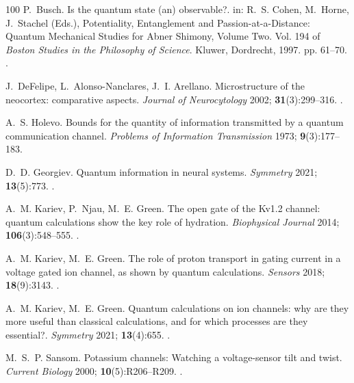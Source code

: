 \documentclass{ws-ijmpb}
\begin{document}
\begin{thebibliography}{100}
P.~Busch. Is the quantum state (an) observable?. in: R.~S. Cohen, M.~Horne,
  J.~Stachel (Eds.), Potentiality, Entanglement and Passion-at-a-Distance:
  Quantum Mechanical Studies for Abner Shimony, Volume Two. Vol. 194 of
  \emph{Boston Studies in the Philosophy of Science}. Kluwer, Dordrecht, 1997.
  pp. 61--70.
\newblock \href {http://doi.org/10.1007/978-94-017-2732-7_5}
  {}.

J.~DeFelipe, L.~Alonso-Nanclares, J.~I. Arellano. Microstructure of the
  neocortex: comparative aspects. \emph{Journal of Neurocytology} 2002;
  \textbf{31}(3):299--316.
\newblock \href {http://doi.org/10.1023/a:1024130211265}
  {}.

A.~S. Holevo. Bounds for the quantity of information transmitted by a quantum
  communication channel. \emph{Problems of Information Transmission} 1973;
  \textbf{9}(3):177--183.

D.~D. Georgiev. Quantum information in neural systems. \emph{Symmetry} 2021;
  \textbf{13}(5):773.
\newblock \href {http://doi.org/10.3390/sym13050773}
  {}.

A.~M. Kariev, P.~Njau, M.~E. Green. The open gate of the {K}v1.2 channel:
  quantum calculations show the key role of hydration. \emph{Biophysical
  Journal} 2014; \textbf{106}(3):548--555.
\newblock \href {http://doi.org/10.1016/j.bpj.2013.11.4495}
  {}.

A.~M. Kariev, M.~E. Green. The role of proton transport in gating current in a
  voltage gated ion channel, as shown by quantum calculations. \emph{Sensors}
  2018; \textbf{18}(9):3143.
\newblock \href {http://doi.org/10.3390/s18093143}
  {}.

A.~M. Kariev, M.~E. Green. Quantum calculations on ion channels: why are they
  more useful than classical calculations, and for which processes are they
  essential?. \emph{Symmetry} 2021; \textbf{13}(4):655.
\newblock \href {http://doi.org/10.3390/sym13040655}
  {}.

M.~S.~P. Sansom. Potassium channels: Watching a voltage-sensor tilt and twist.
  \emph{Current Biology} 2000; \textbf{10}(5):R206--R209.
\newblock \href {http://doi.org/10.1016/S0960-9822(00)00354-7}
  {}.


\end{thebibliography}
\end{document}

